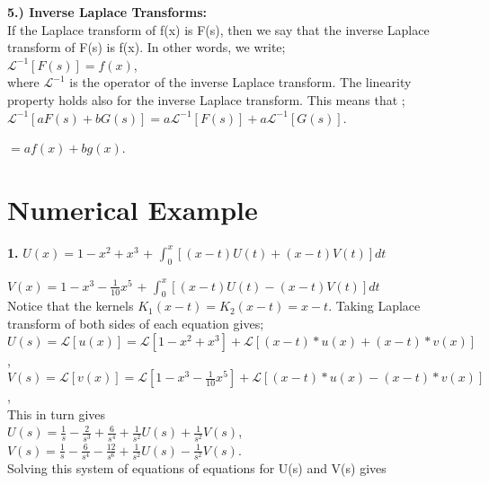 \documentclass[12pt]{article}
\begin{document}
{	\par \textbf{5.)	Inverse Laplace Transforms:}\\
If the Laplace transform of f(x) is F(s), then we say that the inverse Laplace transform of F(s) is f(x). In other words, we write;\\
$\mathcal{L}^{-1}[F(s)] = f(x)$,\\
where $\mathcal{L}^{-1}$ is the operator of the inverse Laplace transform. The linearity property holds also for the inverse Laplace transform. This means that ;\\
$\mathcal{L}^{-1}[aF(s) + bG(s)] = a \mathcal{L}^{-1}[F(s)] +  a \mathcal{L}^{-1}[G(s)]$.\\

\par 								$= af(x) + bg(x)$.\\
\newpage
\section{Numerical Example}


\textbf{1.} $U(x) = 1 - x^2 + x^3$ + \(\int_{0}^{x} [(x - t) U(t) + (x - t)V(t)]dt\)\\
\par$V(x) = 1 - x^3 - \frac{1}{10} x^5$ + \(\int_{0}^{x} [(x - t) U(t) - (x - t)V(t)]dt\)\\

Notice that the kernels $K_1(x − t) = K_2(x − t) = x − t$. Taking Laplace transform of both sides of each equation gives;\\

$U(s) = \mathcal{L}[u(x)] = \mathcal{L}[1 - x^2 + x^3] + \mathcal{L}[(x - t) * u(x) + (x - t) * v(x)]$,\\

$V(s) = \mathcal{L}[v(x)] = \mathcal{L}[1 - x^3 - \frac{1}{10}x^5] + \mathcal{L}[(x - t) * u(x) - (x - t) * v(x)]$,\\

This in turn gives\\

$U(s) = \frac{1}{s} - \frac{2}{s^3} + \frac{6}{s^4} + \frac{1}{s^2}U(s) + \frac{1}{s^2}V(s)$,\\

$V(s) = \frac{1}{s} - \frac{6}{s^4} - \frac{12}{s^6} + \frac{1}{s^2} U(s) - \frac{1}{s^2}V(s)$.\\

Solving this system of equations of equations for U(s) and V(s) gives\\

}
\end{document}
